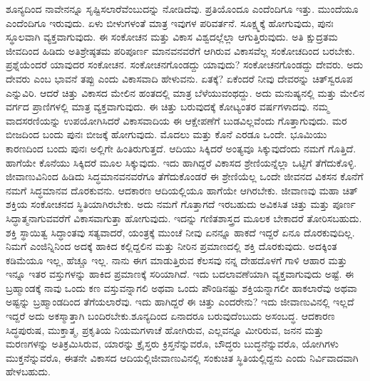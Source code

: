 ಶೂನ್ಯದಿಂದ ನಾವೇನನ್ನೂ ಸೃಷ್ಟಿಸಲಾರೆವೆಂಬುದನ್ನು ನೋಡಿದೆವು. ಪ್ರತಿಯೊಂದೂ ಎಂದೆಂದಿಗೂ ಇತ್ತು. ಮುಂದೆಯೂ ಎಂದೆಂದಿಗೂ ಇರುವುದು. ಏಳು ಬೀಳುಗಳಂತೆ ಮಾತ್ರ ಇವುಗಳ ಪರಿವರ್ತನೆ. ಸೂಕ್ಷ್ಮಕ್ಕೆ ಹೋಗುವುದು, ಪುನಃ ಸ್ಥೂಲವಾಗಿ ವ್ಯಕ್ತವಾಗುವುದು. ಈ ಸಂಕೋಚನ ಮತ್ತು ವಿಕಾಸ ವಿಶ್ವದಲ್ಲೆಲ್ಲಾ ಆಗುತ್ತಿರುವುದು. ಅತಿ ಕ್ಷುದ್ರತಮ ಜೀವದಿಂದ ಹಿಡಿದು ಅತಿಶ್ರೇಷ್ಠತಮ ಪರಿಪೂರ್ಣ ಮಾನವನವರೆಗೆ ಆಗಿರುವ ವಿಕಾಸವೆಲ್ಲ ಸಂಕೋಚದಿಂದ ಬರಬೇಕು. ಪ್ರಶ್ನೆಯೆಂದರೆ ಯಾವುದರ ಸಂಕೋಚನ. ಸಂಕೋಚನಗೊಂಡದ್ದು ಯಾವುದು? ಸಂಕೋಚನಗೊಂಡದ್ದು ದೇವರು. ಅದು ದೇವರು ಎಂಬ ಭಾವನೆ ತಪ್ಪು ಎಂದು ವಿಕಾಸವಾದಿ ಹೇಳುವನು. ಏತಕ್ಕೆ? ಏಕೆಂದರೆ ನೀವು ದೇವರನ್ನು ಚಿತ್​ಸ್ವರೂಪ ಎನ್ನುವಿರಿ. ಆದರೆ ಚಿತ್ತು ವಿಕಾಸದ ಮೇಲಿನ ಹಂತದಲ್ಲಿ ಮಾತ್ರ ಬೆಳೆಯುವಂಥದ್ದು. ಅದು ಮನುಷ್ಯನಲ್ಲಿ ಮತ್ತು ಮೇಲಿನ ವರ್ಗದ ಪ್ರಾಣಿಗಳಲ್ಲಿ ಮಾತ್ರ ವ್ಯಕ್ತವಾಗುವುದು. ಈ ಚಿತ್ತು ಬರುವುದಕ್ಕೆ ಕೋಟ್ಯಂತರ ವರ್ಷಗಳಾದವು. ನಮ್ಮ ವಾದಸರಣಿಯನ್ನು ಉಪಯೋಗಿಸಿದರೆ ವಿಕಾಸವಾದಿಯ ಈ ಆಕ್ಷೇಪಣೆಗೆ ಬುಡವಿಲ್ಲವೆಂದು ಗೊತ್ತಾಗುವುದು. ಮರ ಬೀಜದಿಂದ ಬಂದು ಪುನಃ ಬೀಜಕ್ಕೆ ಹೋಗುವುದು. ಮೊದಲು ಮತ್ತು ಕೊನೆ ಎರಡೂ ಒಂದೇ. ಭೂಮಿಯು ಕಾರಣದಿಂದ ಬಂದು ಪುನಃ ಅಲ್ಲಿಗೇ ಹಿಂತಿರುಗುತ್ತದೆ. ಆದಿಯು ಸಿಕ್ಕಿದರೆ ಅಂತ್ಯವೂ ಸಿಕ್ಕುವುದೆಂದು ನಮಗೆ ಗೊತ್ತಿದೆ. ಹಾಗೆಯೇ ಕೊನೆಯು ಸಿಕ್ಕಿದರೆ ಮೂಲ ಸಿಕ್ಕುವುದು. ಇದು ಹಾಗಿದ್ದರೆ ವಿಕಾಸದ ಶ್ರೇಣಿಯನ್ನೆಲ್ಲಾ ಒಟ್ಟಿಗೆ ತೆಗೆದುಕೊಳ್ಳಿ. ಜೀವಾಣುವಿನಿಂದ ಹಿಡಿದು ಸಿದ್ಧಮಾನವನವರೆಗೂ ತೆಗೆದುಕೊಂಡರೆ ಈ ಶ್ರೇಣಿಯೆಲ್ಲ ಒಂದೇ ಜೀವನದ ವಿಕಸನ ಕೊನೆಗೆ ನಮಗೆ ಸಿದ್ಧಮಾನವ ದೊರಕುವನು. ಆದಕಾರಣ ಆದಿಯಲ್ಲಿಯೂ ಹಾಗೆಯೇ ಆಗಿರಬೇಕು. ಜೀವಾಣವು ಮಹಾ ಚಿತ್​ಶಕ್ತಿಯ ಸಂಕೋಚನದ ಸ್ಥಿತಿಯಾಗಿರಬೇಕು. ಅದು ನಮಗೆ ಗೊತ್ತಾಗದೆ ಇರಬಹುದು ಅವಿಕಸಿತ ಚಿತ್ತು ಮತ್ತು ಪೂರ್ಣ ಸಿದ್ಧಾತ್ಮನಾಗುವವರೆಗೆ ವಿಕಾಸವಾಗುತ್ತಾ ಹೋಗುವುದು. ಇದನ್ನು ಗಣಿತಶಾಸ್ತ್ರದ ಮೂಲಕ ಬೇಕಾದರೆ ತೋರಿಸಬಹುದು. ಶಕ್ತಿ ಸ್ಥಾಯಿತ್ವ ಸಿದ್ಧಾಂತವು ಸತ್ಯವಾದರೆ, ಯಂತ್ರಕ್ಕೆ ಮುಂಚೆ ನೀವು ಏನನ್ನೂ ಹಾಕದೆ ಇದ್ದರೆ ಏನೂ ದೊರಕುವುದಿಲ್ಲ. ನಿಮಗೆ ಎಂಜಿನ್ನಿನಿಂದ ಅದಕ್ಕೆ ಹಾಕಿದ ಕಲ್ಲಿದ್ದಲಿನ ಮತ್ತು ನೀರಿನ ಪ್ರಮಾಣದಲ್ಲಿ ಶಕ್ತಿ ದೊರಕುವುದು. ಅದಕ್ಕಿಂತ ಕಡಿಮೆಯೂ ಇಲ್ಲ, ಹೆಚ್ಚೂ ಇಲ್ಲ. ನಾನು ಈಗ ಮಾಡುತ್ತಿರುವ ಕೆಲಸವು ನನ್ನ ದೇಹದೊಳಗೆ ಗಾಳಿ ಆಹಾರ ಮತ್ತು ಇನ್ನೂ ಇತರ ವಸ್ತುಗಳನ್ನು ಹಾಕಿದ ಪ್ರಮಾಣಕ್ಕೆ ಸರಿಯಾಗಿದೆ. ಇದು ಬದಲಾವಣೆಯಾಗಿ ವ್ಯಕ್ತವಾಗುವುದು ಅಷ್ಟೆ. ಈ ಬ್ರಹ್ಮಾಂಡಕ್ಕೆ ನಾವು ಒಂದು ಕಣ ವಸ್ತುವನ್ನಾಗಲಿ ಅಥವಾ ಒಂದು ಪೌಂಡಿನಷ್ಟು ಶಕ್ತಿಯನ್ನಾಗಲೀ ಹಾಕಲಾರೆವು ಅಥವಾ ಅಷ್ಟನ್ನು ಬ್ರಹ್ಮಾಂಡದಿಂದ ತೆಗೆಯಲಾರೆವು. ಇದು ಹಾಗಿದ್ದರೆ ಈ ಚಿತ್ತು ಎಂದರೇನು? ಇದು ಜೀವಾಣುವಿನಲ್ಲಿ ಇಲ್ಲದೆ ಇದ್ದರೆ ಅದು ಅಕಸ್ಮಾತ್ತಾಗಿ ಬಂದಿರಬೇಕು.\break ಶೂನ್ಯದಿಂದ ಏನಾದರೂ ಬರುವುದೆಂಬುದು ಅಸಂಬದ್ಧ. ಆದಕಾರಣ ಸಿದ್ಧಪುರುಷ, ಮುಕ್ತಾತ್ಮ, ಪ್ರಕೃತಿಯ ನಿಯಮಗಳಾಚೆ ಹೋಗಿರುವ, ಎಲ್ಲವನ್ನೂ ಮೀರಿರುವ, ಜನನ ಮತ್ತು ಮರಣಗಳನ್ನು ಅತಿಕ್ರಮಿಸಿರುವ, ಯಾರನ್ನು ಕ್ರೈಸ್ತರು ಕ್ರಿಸ್ತನೆನ್ನುವರೊ, ಬೌದ್ಧರು ಬುದ್ಧನೆನ್ನುವರೊ, ಯೋಗಿಗಳು ಮುಕ್ತನೆನ್ನುವರೊ, ಈತನೇ ವಿಕಾಸದ ಆದಿಯಲ್ಲಿ\break ಜೀವಾಣುವಿನಲ್ಲಿ ಸಂಕುಚಿತ ಸ್ಥಿತಿಯಲ್ಲಿದ್ದನು ಎಂದು ನಿರ್ವಿವಾದವಾಗಿ ಹೇಳಬಹುದು.

\vskip 0.3cm

